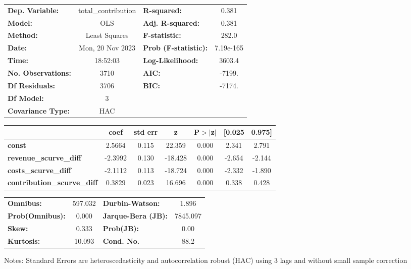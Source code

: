\begin{center}
\begin{tabular}{lclc}
\toprule
\textbf{Dep. Variable:}             & total\_contribution & \textbf{  R-squared:         } &     0.381   \\
\textbf{Model:}                     &         OLS         & \textbf{  Adj. R-squared:    } &     0.381   \\
\textbf{Method:}                    &    Least Squares    & \textbf{  F-statistic:       } &     282.0   \\
\textbf{Date:}                      &   Mon, 20 Nov 2023  & \textbf{  Prob (F-statistic):} & 7.19e-165   \\
\textbf{Time:}                      &       18:52:03      & \textbf{  Log-Likelihood:    } &    3603.4   \\
\textbf{No. Observations:}          &          3710       & \textbf{  AIC:               } &    -7199.   \\
\textbf{Df Residuals:}              &          3706       & \textbf{  BIC:               } &    -7174.   \\
\textbf{Df Model:}                  &             3       & \textbf{                     } &             \\
\textbf{Covariance Type:}           &         HAC         & \textbf{                     } &             \\
\bottomrule
\end{tabular}
\begin{tabular}{lcccccc}
                                    & \textbf{coef} & \textbf{std err} & \textbf{z} & \textbf{P$> |$z$|$} & \textbf{[0.025} & \textbf{0.975]}  \\
\midrule
\textbf{const}                      &       2.5664  &        0.115     &    22.359  &         0.000        &        2.341    &        2.791     \\
\textbf{revenue\_scurve\_diff}      &      -2.3992  &        0.130     &   -18.428  &         0.000        &       -2.654    &       -2.144     \\
\textbf{costs\_scurve\_diff}        &      -2.1112  &        0.113     &   -18.724  &         0.000        &       -2.332    &       -1.890     \\
\textbf{contribution\_scurve\_diff} &       0.3829  &        0.023     &    16.696  &         0.000        &        0.338    &        0.428     \\
\bottomrule
\end{tabular}
\begin{tabular}{lclc}
\textbf{Omnibus:}       & 597.032 & \textbf{  Durbin-Watson:     } &    1.896  \\
\textbf{Prob(Omnibus):} &   0.000 & \textbf{  Jarque-Bera (JB):  } & 7845.097  \\
\textbf{Skew:}          &   0.333 & \textbf{  Prob(JB):          } &     0.00  \\
\textbf{Kurtosis:}      &  10.093 & \textbf{  Cond. No.          } &     88.2  \\
\bottomrule
\end{tabular}
\end{center}

Notes: \newline
 [1] Standard Errors are heteroscedasticity and autocorrelation robust (HAC) using 3 lags and without small sample correction